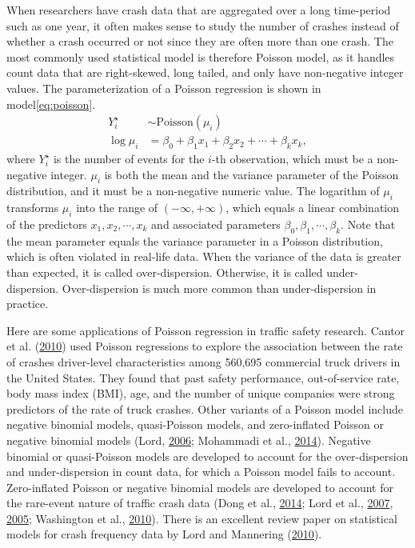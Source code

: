 \documentclass[12pt]{book}
\numberwithin{equation}{chapter}
\begin{document}
When researchers have crash data that are aggregated over a long time-period such as one year, it often makes sense to study the number of crashes instead of whether a crash occurred or not since they are often more than one crash. The most commonly used statistical model is therefore Poisson model, as it handles count data that are right-skewed, long tailed, and only have non-negative integer values. The parameterization of a Poisson regression is shown in model\eqref{eq:poisson}.
\begin{equation}
\begin{split}
Y_i^\star & \sim \text{Poisson}(\mu_i) \\
\log\mu_i & = \beta_0 + \beta_1x_1 + \beta_2x_2 + \cdots + \beta_kx_k,
\label{eq:poisson}
\end{split}
\end{equation}
where \(Y_i^\star\) is the number of events for the \(i\)-th observation, which must be a non-negative integer. \(\mu_i\) is both the mean and the variance parameter of the Poisson distribution, and it must be a non-negative numeric value. The logarithm of \(\mu_i\) transforms \(\mu_i\) into the range of \((-\infty, +\infty)\), which equals a linear combination of the predictors \(x_1, x_2, \cdots, x_k\) and associated parameters \(\beta_0, \beta_1, \cdots, \beta_k\). Note that the mean parameter equals the variance parameter in a Poisson distribution, which is often violated in real-life data. When the variance of the data is greater than expected, it is called over-dispersion. Otherwise, it is called under-dispersion. Over-dispersion is much more common than under-dispersion in practice.

Here are some applications of Poisson regression in traffic safety research. Cantor et al. (\protect\hyperlink{ref-cantor2010driver}{2010}) used Poisson regressions to explore the association between the rate of crashes driver-level characteristics among 560,695 commercial truck drivers in the United States. They found that past safety performance, out-of-service rate, body mass index (BMI), age, and the number of unique companies were strong predictors of the rate of truck crashes. Other variants of a Poisson model include negative binomial models, quasi-Poisson models, and zero-inflated Poisson or negative binomial models (Lord, \protect\hyperlink{ref-lord2006modeling}{2006}; Mohammadi et al., \protect\hyperlink{ref-mohammadi2014crash}{2014}). Negative binomial or quasi-Poisson models are developed to account for the over-dispersion and under-dispersion in count data, for which a Poisson model fails to account. Zero-inflated Poisson or negative binomial models are developed to account for the rare-event nature of traffic crash data (Dong et al., \protect\hyperlink{ref-dong2014multivariate}{2014}; Lord et al., \protect\hyperlink{ref-lord2007further}{2007}, \protect\hyperlink{ref-lord2005poisson}{2005}; Washington et al., \protect\hyperlink{ref-washington2010statistical}{2010}). There is an excellent review paper on statistical models for crash frequency data by Lord and Mannering (\protect\hyperlink{ref-lord2010statistical}{2010}).
\end{document}
